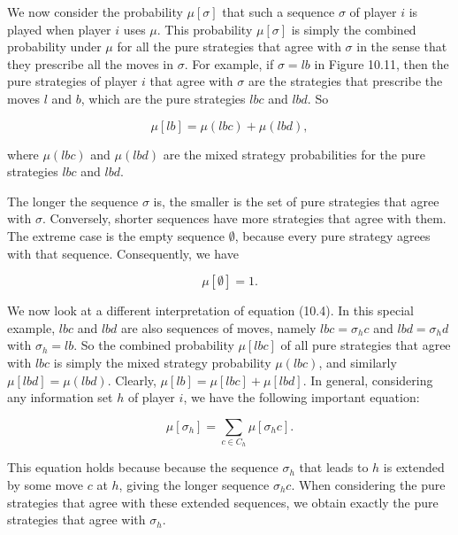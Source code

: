 \documentclass[12pt]{article}
\begin{document}
We now consider the probability $\mu[\sigma]$ that such a sequence $\sigma$ of player $i$ is played when player $i$ uses $\mu$. This probability $\mu[\sigma]$ is simply the combined probability under $\mu$ for all the pure strategies that agree with $\sigma$ in the sense that they prescribe all the moves in $\sigma$. For example, if $\sigma=l b$ in Figure 10.11, then the pure strategies of player $i$ that agree with $\sigma$ are the strategies that prescribe the moves $l$ and $b$, which are the pure strategies $l b c$ and $l b d$. So


\begin{equation*}
\mu[l b]=\mu(l b c)+\mu(l b d), \tag{10.4}
\end{equation*}


where $\mu(l b c)$ and $\mu(l b d)$ are the mixed strategy probabilities for the pure strategies $l b c$ and $l b d$.

The longer the sequence $\sigma$ is, the smaller is the set of pure strategies that agree with $\sigma$. Conversely, shorter sequences have more strategies that agree with them. The extreme case is the empty sequence $\emptyset$, because every pure strategy agrees with that sequence. Consequently, we have


\begin{equation*}
\mu[\emptyset]=1 . \tag{10.5}
\end{equation*}


We now look at a different interpretation of equation (10.4). In this special example, $l b c$ and $l b d$ are also sequences of moves, namely $l b c=\sigma_{h} c$ and $l b d=\sigma_{h} d$ with $\sigma_{h}=l b$. So the combined probability $\mu[l b c]$ of all pure strategies that agree with $l b c$ is simply the mixed strategy probability $\mu(l b c)$, and similarly $\mu[l b d]=\mu(l b d)$. Clearly, $\mu[l b]=\mu[l b c]+\mu[l b d]$. In general, considering any information set $h$ of player $i$, we have the following important equation:


\begin{equation*}
\mu\left[\sigma_{h}\right]=\sum_{c \in C_{h}} \mu\left[\sigma_{h} c\right] . \tag{10.6}
\end{equation*}


This equation holds because because the sequence $\sigma_{h}$ that leads to $h$ is extended by some move $c$ at $h$, giving the longer sequence $\sigma_{h} c$. When considering the pure strategies that agree with these extended sequences, we obtain exactly the pure strategies that agree with $\sigma_{h}$.
\end{document}
